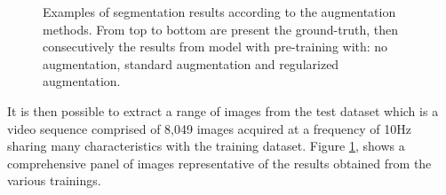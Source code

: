 \begin{figure}[h]
\begin{subfigure}[b]{0.18\linewidth}
	\end{subfigure}
	
	\caption[Examples of segmentation results according to the augmentation methods.]{Examples of segmentation results according to the augmentation methods. From top to bottom are present the ground-truth, then consecutively the results from model with pre-training with: no augmentation, standard augmentation and regularized augmentation.}
	\label{figres_aug}
\end{figure}

It is then possible to extract a range of images from the test dataset which is a video sequence comprised of 8,049 images acquired at a frequency of 10Hz sharing many characteristics with the training dataset.
Figure \ref{figres_aug}, shows a comprehensive panel of images representative of the results obtained from the various trainings.




